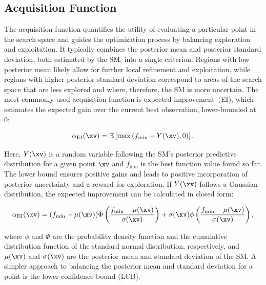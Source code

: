 \documentclass[12pt,letterpaper]{article}
\begin{document}
\subsection*{Acquisition Function}

\label{sec:acquisition-function}

The acquisition function quantifies the utility of evaluating a particular point in the search space and guides the optimization process by balancing exploration and exploitation.
It typically combines the posterior mean and posterior standard deviation, both estimated by the SM, into a single criterion.
Regions with low posterior mean likely allow for further local refinement and exploitation, while regions with higher posterior standard deviation correspond to areas of the search space that are less explored and where, therefore, the SM is more uncertain.
The most commonly used acquisition function is expected improvement~(EI)\cite{jones1998, kushner1964, mockus1978}, which estimates the expected gain over the current best observation, lower-bounded at 0:

\begin{displaymath}
\alpha_{\mathrm{EI}}(\xv) = \mathbb{E} \left[ \max \left( f_{\mathrm{min}} - Y(\xv), 0 \right) \right].
\end{displaymath}

Here, $Y(\xv)$ is a random variable following the SM's posterior predictive distribution for a given point $\xv$ and $f_{\mathrm{min}}$ is the best function value found so far.
The lower bound ensures positive gains and leads to positive incorporation of posterior uncertainty and a reward for exploration. 
If $Y(\xv)$ follows a Gaussian distribution, the expected improvement can be calculated in closed form:

\begin{displaymath}
    \alpha_{\mathrm{EI}}(\xv) = (f_{\mathrm{min}} - \mu(\xv)) \Phi\left(\frac{f_{\mathrm{min}} - \mu(\xv)}{\sigma(\xv)}\right) + \sigma(\xv) \phi\left(\frac{f_{\mathrm{min}} - \mu(\xv)}{\sigma(\xv)}\right),
\end{displaymath}

where $\phi$ and $\Phi$ are the probability density function and the cumulative distribution function of the standard normal distribution, respectively, and $\mu(\xv)$ and $\sigma(\xv)$ are the posterior mean and standard deviation of the SM.
A simpler approach to balancing the posterior mean and standard deviation for a point \xv is the lower confidence bound (LCB)\cite{cox1997,srinivas2010}.
\end{document}
